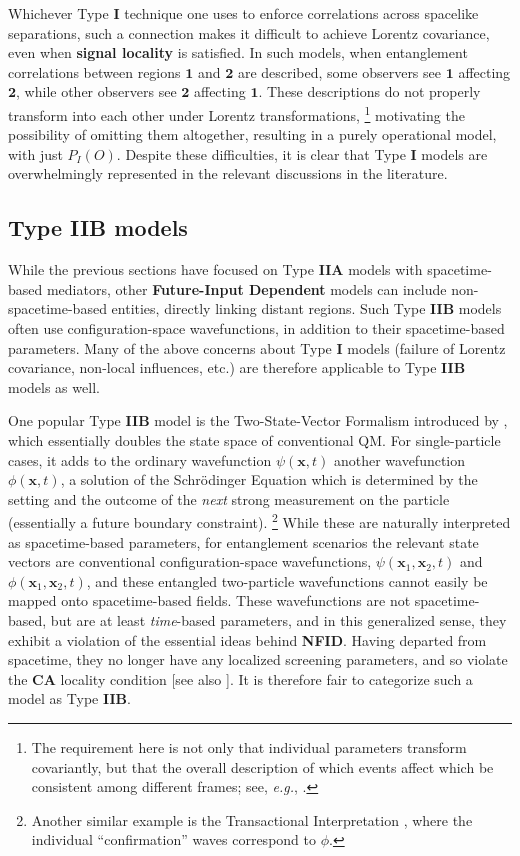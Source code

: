 \documentclass[onecolumn, nofootinbib, 12pt]{revtex4-1}
\begin{document}
Whichever Type {\bf I} technique one uses to enforce correlations across spacelike separations, such a connection makes it difficult to achieve Lorentz covariance, even when {\bf signal locality} is satisfied.  In such models, when entanglement correlations between regions $\bm{1}$ and $\bm{2}$ are described, some observers see $\bm{1}$ affecting $\bm{2}$, while other observers see $\bm{2}$ affecting $\bm{1}$.  These descriptions do not properly transform into each other under Lorentz transformations,%
\footnote{The requirement here is not only that individual parameters transform covariantly, but that the overall description of which events affect which be consistent among different frames; see, \emph{e.g.}, \textcite{gisin2010}.}
motivating the possibility of omitting them altogether, resulting in a purely operational model, with just $P_I(O)$.  Despite these difficulties, it is clear that Type {\bf I} models are overwhelmingly represented in the relevant discussions in the literature.


\subsection{Type {\bf IIB} models}

While the previous sections have focused on Type {\bf IIA} models with spacetime-based mediators, other {\bf Future-Input Dependent} models can include non-spacetime-based entities, directly linking distant regions.  Such Type {\bf IIB} models often use configuration-space wavefunctions, in addition to their spacetime-based parameters.  Many of the above concerns about Type {\bf I} models (failure of Lorentz covariance, non-local influences, etc.) are therefore applicable to Type {\bf IIB} models as well. 

One popular Type {\bf IIB} model is the Two-State-Vector Formalism introduced by \textcite{aharonov1991}, which essentially doubles the state space of conventional QM.  For single-particle cases, it adds to the ordinary wavefunction $\psi(\bm{x},t)$ another wavefunction $\phi({\bm{x},t})$, a solution of the Schr\"odinger Equation which is determined by the setting and the outcome of the \emph{next} strong measurement on the particle (essentially a future boundary constraint).%
\footnote{Another similar example is the Transactional Interpretation \cite{cramer1980, cramer2016}, where the individual ``confirmation'' waves correspond to $\phi$.}  While these are naturally interpreted as spacetime-based parameters, for entanglement scenarios the relevant state vectors are conventional configuration-space wavefunctions, $\psi(\bm{x}_1,\bm{x}_2,t)$ and $\phi(\bm{x}_1,\bm{x}_2,t)$, and these entangled two-particle wavefunctions cannot easily be mapped onto spacetime-based fields. 
These wavefunctions are not spacetime-based, but are at least \emph{time}-based parameters, and in this generalized sense, they exhibit a violation of the essential ideas behind {\bf NFID}.  Having departed from spacetime, they no longer have any localized screening parameters, and so violate the {\bf CA} locality condition [see also \textcite{vaidman2013}].  It is therefore fair to categorize such a model as Type {\bf IIB}.
\end{document}
